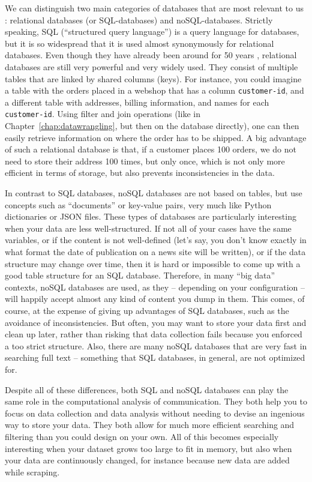 We can distinguish two main categories of databases
that are most relevant to us \citep[see also][]{Gunther2018}:
relational databases (or SQL-databases) and noSQL-databases. Strictly
speaking, SQL (``structured query language'') is a query language for
databases, but it is so widespread that it is used almost synonymously
for relational databases. Even though they have already been around for
 50 years \citep{Codd1970}, relational databases are still  very
powerful and very widely used.  They consist of multiple tables that
are linked by shared columns (keys). For instance, you could imagine a
table with the orders placed in a webshop that has a column
\verb|customer-id|, and a different table with addresses, billing
information, and names for each \verb|customer-id|. Using filter and join
operations (like in Chapter~\ref{chap:datawrangling}, but then on the database directly), one can then easily retrieve
information on where the order has to be shipped. A big advantage of
such a relational database is that, if a customer places 100 orders,
we do not need to store their address 100 times, but only once, which
is not only more efficient in terms of storage, but also prevents
inconsistencies in the data.

In contrast to SQL databases, noSQL databases are not based on tables,
but use concepts such as ``documents'' or key-value pairs, very much
like Python dictionaries or JSON files. These types of databases are
particularly interesting when your data are less well-structured. If
not all of your cases have the same variables, or if the content is not
well-defined (let's say, you don't know exactly in what format the date
of publication on a news site will be written), or if the data structure
may change over time, then it is hard or impossible to come up with a
good table structure for an SQL database. Therefore, in many ``big data''
contexts, noSQL databases are used, as they -- depending on your
configuration -- will happily accept almost any kind of content you dump
in them. This comes, of course, at the expense of giving up advantages
of SQL databases, such as the avoidance of inconsistencies. But often,
you may  want to store your data first and clean up later, rather
than risking that data collection fails because you enforced a too strict
structure. Also, there are many noSQL databases that are very fast in
searching full text -- something that SQL databases, in general, are
not optimized for.

Despite all of these differences, both SQL and noSQL databases can play
the same role in the computational analysis of communication. They both
help you to focus on data collection and data analysis without needing
to devise an ingenious way to store your data. They both allow for much
more efficient searching and filtering than you could design on your own.
All of this becomes especially interesting when your dataset grows too
large to fit in memory, but also when your data are continuously changed,
for instance because new data are added while scraping.


